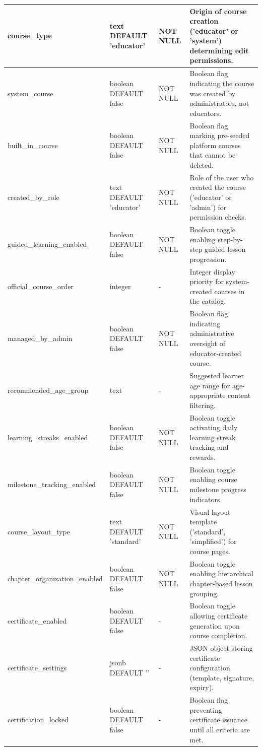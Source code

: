 \documentclass[12pt, oneside]{article} %
\newcommand{\tabbreak}{\hyphenpenalty=200\exhyphenpenalty=200\tolerance=4000\hbadness=10000\hspace{0pt}}
\begin{document}
{\begin{longtable}{|>{\raggedright\arraybackslash\tabbreak}p{2.67cm}|>{\raggedright\arraybackslash\tabbreak}p{2.93cm}|>{\raggedright\arraybackslash\tabbreak}p{2.67cm}|>{\raggedright\arraybackslash\tabbreak}p{4.51cm}|}
course\_type & text DEFAULT 'educator' & NOT NULL & Origin of course creation ('educator' or 'system') determining edit permissions. \\ \hline
system\_course & boolean DEFAULT false & NOT NULL & Boolean flag indicating the course was created by administrators, not educators. \\ \hline
built\_in\_course & boolean DEFAULT false & NOT NULL & Boolean flag marking pre-seeded platform courses that cannot be deleted. \\ \hline
created\_by\_role & text DEFAULT 'educator' & NOT NULL & Role of the user who created the course ('educator' or 'admin') for permission checks. \\ \hline
guided\_learning\_enabled & boolean DEFAULT false & NOT NULL & Boolean toggle enabling step-by-step guided lesson progression. \\ \hline
official\_course\_order & integer & - & Integer display priority for system-created courses in the catalog. \\ \hline
managed\_by\_admin & boolean DEFAULT false & NOT NULL & Boolean flag indicating administrative oversight of educator-created course. \\ \hline
recommended\_age\_group & text & - & Suggested learner age range for age-appropriate content filtering. \\ \hline
learning\_streaks\_enabled & boolean DEFAULT false & NOT NULL & Boolean toggle activating daily learning streak tracking and rewards. \\ \hline
milestone\_tracking\_enabled & boolean DEFAULT false & NOT NULL & Boolean toggle enabling course milestone progress indicators. \\ \hline
course\_layout\_type & text DEFAULT 'standard' & NOT NULL & Visual layout template ('standard', 'simplified') for course pages. \\ \hline
chapter\_organization\_enabled & boolean DEFAULT false & NOT NULL & Boolean toggle enabling hierarchical chapter-based lesson grouping. \\ \hline
certificate\_enabled & boolean DEFAULT false & - & Boolean toggle allowing certificate generation upon course completion. \\ \hline
certificate\_settings & jsonb DEFAULT '{}' & - & JSON object storing certificate configuration (template, signature, expiry). \\ \hline
certification\_locked & boolean DEFAULT false & - & Boolean flag preventing certificate issuance until all criteria are met. \\ \hline

\end{longtable}}
\end{document}
